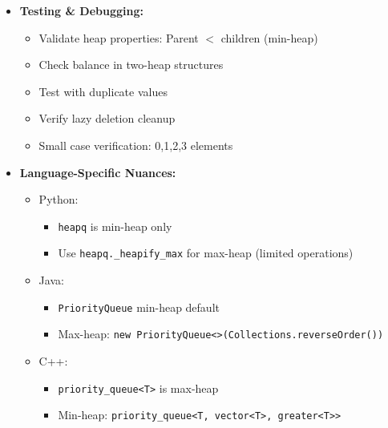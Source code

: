 \documentclass[a4paper,10pt]{book}
\begin{document}
\begin{itemize}
    \item \textbf{Testing \& Debugging:}
    \begin{itemize}
        \item Validate heap properties: Parent $<$ children (min-heap)
        \item Check balance in two-heap structures
        \item Test with duplicate values
        \item Verify lazy deletion cleanup
        \item Small case verification: 0,1,2,3 elements
    \end{itemize}
    
    \item \textbf{Language-Specific Nuances:}
    \begin{itemize}
        \item Python:
        \begin{itemize}
            \item \texttt{heapq} is min-heap only
            \item Use \texttt{heapq.\_heapify\_max} for max-heap (limited operations)
        \end{itemize}
        \item Java:
        \begin{itemize}
            \item \texttt{PriorityQueue} min-heap default
            \item Max-heap: \texttt{new PriorityQueue<>(Collections.reverseOrder())}
        \end{itemize}
        \item C++:
        \begin{itemize}
            \item \texttt{priority\_queue<T>} is max-heap
            \item Min-heap: \texttt{priority\_queue<T, vector<T>, greater<T>>}
        \end{itemize}
    \end{itemize}
\end{itemize}
\end{document}
